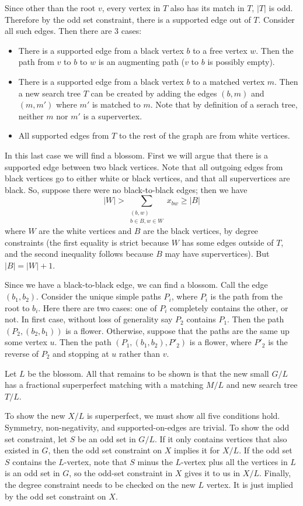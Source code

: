 \documentclass{hmcpset}
\begin{document}
\begin{solution}
\begin{enumerate}
Since other than the root $v$, every vertex in $T$ also has its match in $T$, $|T|$ is odd. Therefore by the odd set constraint, there is a supported edge out of $T$. Consider all such edges. Then there are 3 cases:
\begin{itemize}
\item There is a supported edge from a black vertex $b$ to a free vertex $w$. Then the path from $v$ to $b$ to $w$ is an augmenting path ($v$ to $b$ is possibly empty).
\item There is a supported edge from a black vertex $b$ to a matched vertex $m$. Then a new search tree $T$ can be created by adding the edges $(b,m)$ and $(m, m')$ where $m'$ is matched to $m$. Note that by definition of a serach tree, neither $m$ nor $m'$ is a supervertex.
\item All supported edges from $T$ to the rest of the graph are from white vertices.
\end{itemize}
In this last case we will find a blossom. First we will argue that there is a supported edge between two black vertices. Note that all outgoing edges from black vertices go to either white or black vertices, and that all supervertices are black. So, suppose there were no black-to-black edges; then we have
\[|W| > \sum_{\substack{(b,w)\\ b \in B, w\in W}} x_{bw} \geq |B|\]
where $W$ are the white vertices and $B$ are the black vertices, by degree constraints (the first equality is strict because $W$ has some edges outside of $T$, and the second inequality follows because $B$ may have supervertices). But $|B| = |W| + 1$.

Since we have a black-to-black edge, we can find a blossom. Call the edge $(b_1, b_2)$. Consider the unique simple paths $P_i$, where $P_i$ is the path from the root to $b_i$. Here there are two cases: one of $P_i$ completely contains the other, or not. In first case, without loss of generality say $P_2$ contains $P_1$. Then the path $(P_2, (b_2,b_1))$ is a flower. Otherwise, suppose that the paths are the same up some vertex $u$. Then the path $(P_1, (b_1, b_2), P'_2)$ is a flower, where $P'_2$ is the reverse of $P_2$ and stopping at $u$ rather than $v$.

Let $L$ be the blossom. All that remains to be shown is that the new small $G/L$ has a fractional superperfect matching with a matching $M/L$ and new search tree $T/L$.

To show the new $X/L$ is superperfect, we must show all five conditions hold. Symmetry, non-negativity, and supported-on-edges are trivial. To show the odd set constraint, let $S$ be an odd set in $G/L$. If it only contains vertices that also existed in $G$, then the odd set constraint on $X$ implies it for $X/L$. If the odd set $S$ contains the $L$-vertex, note that $S$ minus the $L$-vertex plus all the vertices in $L$ is an odd set in $G$, so the odd-set constraint in $X$ gives it to us in $X/L$. Finally, the degree constraint needs to be checked on the new $L$ vertex. It is just implied by the odd set constraint on $X$.


\end{enumerate}
\end{solution}
\end{document}
